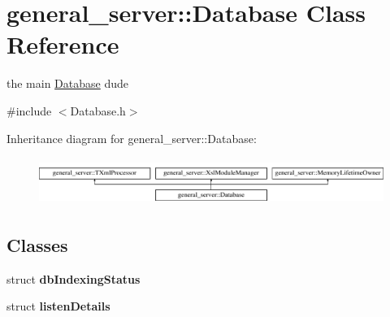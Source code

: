 \hypertarget{classgeneral__server_1_1Database}{\section{general\-\_\-server\-:\-:\-Database \-Class \-Reference}
\label{classgeneral__server_1_1Database}
}


the main \hyperlink{classgeneral__server_1_1Database}{\-Database} dude  




{\ttfamily \#include $<$\-Database.\-h$>$}

\-Inheritance diagram for general\-\_\-server\-:\-:\-Database\-:\begin{figure}[H]
\begin{center}
\leavevmode
\includegraphics[height=1.555556cm]{classgeneral__server_1_1Database}
\end{center}
\end{figure}
\subsection*{\-Classes}
\begin{DoxyCompactItemize}
\item 
struct {\bfseries db\-Indexing\-Status}
\item 
struct {\bfseries listen\-Details}
\end{DoxyCompactItemize}
